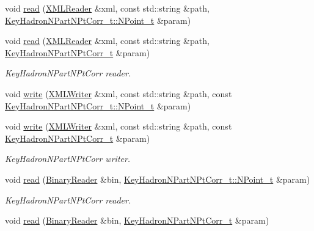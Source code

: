 \begin{DoxyCompactItemize}
void \mbox{\hyperlink{namespaceHadron_aef0c0dfd0f87842b485511132f1c405f}{read}} (\mbox{\hyperlink{classADATXML_1_1XMLReader}{X\+M\+L\+Reader}} \&xml, const std\+::string \&path, \mbox{\hyperlink{structHadron_1_1KeyHadronNPartNPtCorr__t_1_1NPoint__t}{Key\+Hadron\+N\+Part\+N\+Pt\+Corr\+\_\+t\+::\+N\+Point\+\_\+t}} \&param)
\item 
void \mbox{\hyperlink{namespaceHadron_a85b27e940a60880e6f98fb6a939d96c2}{read}} (\mbox{\hyperlink{classADATXML_1_1XMLReader}{X\+M\+L\+Reader}} \&xml, const std\+::string \&path, \mbox{\hyperlink{structHadron_1_1KeyHadronNPartNPtCorr__t}{Key\+Hadron\+N\+Part\+N\+Pt\+Corr\+\_\+t}} \&param)
\begin{DoxyCompactList}\small\item\em Key\+Hadron\+N\+Part\+N\+Pt\+Corr reader. \end{DoxyCompactList}\item 
void \mbox{\hyperlink{namespaceHadron_af4fede7daa1a73ae6be48e039292c692}{write}} (\mbox{\hyperlink{classADATXML_1_1XMLWriter}{X\+M\+L\+Writer}} \&xml, const std\+::string \&path, const \mbox{\hyperlink{structHadron_1_1KeyHadronNPartNPtCorr__t_1_1NPoint__t}{Key\+Hadron\+N\+Part\+N\+Pt\+Corr\+\_\+t\+::\+N\+Point\+\_\+t}} \&param)
\item 
void \mbox{\hyperlink{namespaceHadron_a295fddb7420012571f5b8115f2b25a97}{write}} (\mbox{\hyperlink{classADATXML_1_1XMLWriter}{X\+M\+L\+Writer}} \&xml, const std\+::string \&path, const \mbox{\hyperlink{structHadron_1_1KeyHadronNPartNPtCorr__t}{Key\+Hadron\+N\+Part\+N\+Pt\+Corr\+\_\+t}} \&param)
\begin{DoxyCompactList}\small\item\em Key\+Hadron\+N\+Part\+N\+Pt\+Corr writer. \end{DoxyCompactList}\item 
void \mbox{\hyperlink{namespaceHadron_a9478eee791b9cb2c8523893a334602e2}{read}} (\mbox{\hyperlink{classADATIO_1_1BinaryReader}{Binary\+Reader}} \&bin, \mbox{\hyperlink{structHadron_1_1KeyHadronNPartNPtCorr__t_1_1NPoint__t}{Key\+Hadron\+N\+Part\+N\+Pt\+Corr\+\_\+t\+::\+N\+Point\+\_\+t}} \&param)
\begin{DoxyCompactList}\small\item\em Key\+Hadron\+N\+Part\+N\+Pt\+Corr reader. \end{DoxyCompactList}\item 
void \mbox{\hyperlink{namespaceHadron_a51412e3f2ebc9c4d67ed1cc397c4d546}{read}} (\mbox{\hyperlink{classADATIO_1_1BinaryReader}{Binary\+Reader}} \&bin, \mbox{\hyperlink{structHadron_1_1KeyHadronNPartNPtCorr__t}{Key\+Hadron\+N\+Part\+N\+Pt\+Corr\+\_\+t}} \&param)

\end{DoxyCompactItemize}
